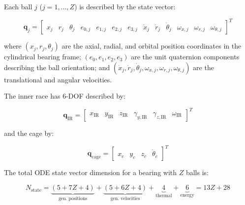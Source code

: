 \documentclass[machines,article,submit,pdftex,moreauthors]{Definitions/mdpi}
\begin{document}
Each ball $j$ ($j = 1, \ldots, Z$) is described by the state vector:

\begin{linenomath}
\begin{equation}
    \bm{q}_j = \begin{bmatrix} x_j & r_j & \theta_j & e_{0,j} & e_{1,j} & e_{2,j} & e_{3,j} & \dot{x}_j & \dot{r}_j & \dot{\theta}_j & \omega_{x,j} & \omega_{r,j} & \omega_{\theta,j} \end{bmatrix}^T
    \label{eq:ball_state}
\end{equation}
\end{linenomath}

where $(x_j, r_j, \theta_j)$ are the axial, radial, and orbital position coordinates in the cylindrical bearing frame; $(e_0, e_1, e_2, e_3)$ are the unit quaternion components describing the ball orientation; and $(\dot{x}_j, \dot{r}_j, \dot{\theta}_j, \omega_{x,j}, \omega_{r,j}, \omega_{\theta,j})$ are the translational and angular velocities.

The inner race has 6-DOF described by:

\begin{linenomath}
\begin{equation}
    \bm{q}_{\text{IR}} = \begin{bmatrix} x_{\text{IR}} & y_{\text{IR}} & z_{\text{IR}} & \gamma_{y,\text{IR}} & \gamma_{z,\text{IR}} & \omega_{\text{IR}} \end{bmatrix}^T
\end{equation}
\end{linenomath}

and the cage by:

\begin{linenomath}
\begin{equation}
    \bm{q}_{\text{cage}} = \begin{bmatrix} x_c & y_c & z_c & \dot{\theta}_c \end{bmatrix}^T
\end{equation}
\end{linenomath}

The total ODE state vector dimension for a bearing with $Z$ balls is:

\begin{linenomath}
\begin{equation}
    N_{\text{state}} = \underbrace{(5 + 7Z + 4)}_{\text{gen.\ positions}} + \underbrace{(5 + 6Z + 4)}_{\text{gen.\ velocities}} + \underbrace{4}_{\text{thermal}} + \underbrace{6}_{\text{energy}} = 13Z + 28
    \label{eq:ndof}
\end{equation}
\end{linenomath}
\end{document}
